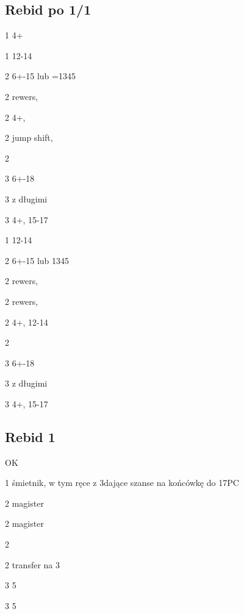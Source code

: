 \documentclass[12pt, a4paper]{article}
\begin{document}
\subsection*{Rebid po 1/1}

\sequence{{1\clubs}{1\hearts}}
\begin{options}[1]
    \item[1\spades] 4+\spades \nf
    \item[1\nt] 12-14 \bal
    \item[2\clubs] 6+-15 lub =1345 
    \item[2\diams] rewers, \fonce
    \item[2\hearts] 4+\hearts, \nf
    \item[2\spades] jump shift, \gf
    \item[2\nt] \gf
    \item[3\clubs] 6+-18 
    \item[3\diams] \gf z długimi \clubs \vimp
    \item[3\hearts] 4+\hearts, 15-17 
\end{options}

\sequence{{1\clubs}{1\spades}}
\begin{options}[1]
    \item[1\nt] 12-14 \bal
    \item[2\clubs] 6+-15 lub 1345\clubs 
    \item[2\diams] rewers, \fonce
    \item[2\hearts] rewers, \fonce
    \item[2\spades] 4+\spades, 12-14
    \item[2\nt] \gf
    \item[3\clubs] 6+-18 
    \item[3\diams] \gf z długimi \clubs \vimp
    \item[3\spades] 4+\spades, 15-17 
\end{options}

\pagebreak
\subsection*{Rebid 1\spades}
\sequence{{1\clubs}{1\hearts}{1\spades}}
\begin{options}[2]
    \item[\pass] OK
    \item[1\nt] śmietnik, w tym ręce z 3\spades dające szanse na końcówkę do 17PC
    \item[2\clubs] magister
    \item[2\diams] magister
    \item[2\hearts] \soff
    \item[2\nt] transfer na 3\clubs \vimp
    \item[3\clubs] 5\clubs \gf \imp
    \item[3\diams] 5\diams \gf \imp
\end{options}
\end{document}
